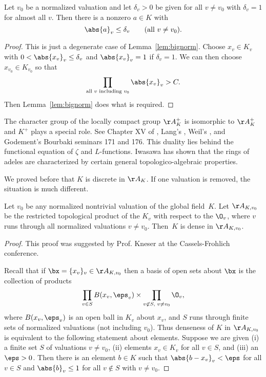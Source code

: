 \documentclass[11pt]{book}
\begin{document}
\begin{ch}
\begin{corollary}\label{cor:small_a}
Let $v_0$ be a normalized valuation and let $\delta_v>0$ be given
for all $v\neq v_0$ with $\delta_v = 1$ for almost all $v$.  Then
there is a nonzero $a\in K$ with
$$
  \abs{a}_v \leq \delta_v\qquad\text{(all $v\neq v_0$)}.
$$
\end{corollary}
\begin{proof}
This is just a degenerate case of Lemma~\ref{lem:bignorm}.
Choose $x_v\in K_v$ with $0< \abs{x_v}_v \leq \delta_v$
and $\abs{x_v}_v=1$ if $\delta_v=1$.  We can then choose
$x_{v_0}\in K_{v_0}$ so that
$$
\prod_{\text{all $v$ including $v_0$}} \abs{x_v}_v > C.
$$
Then Lemma~\ref{lem:bignorm} does what is required.
\end{proof}

\begin{remark}
  The character group of the locally compact group $\AA_K^+$ is
  isomorphic to $\AA_K^+$ and $K^+$ plays a special role.  See Chapter
  XV of \cite{cassels-frohlich}, Lang's \cite{lang:algebraic_numbers},
  Weil's \cite{weil:adeles}, and Godement's Bourbaki seminars 171 and
  176.  This duality lies behind the functional equation of $\zeta$
  and $L$-functions.  Iwasawa has shown \cite{iwasawa:adele} that the
  rings of adeles are characterized by certain general
  topologico-algebraic properties.
\end{remark}

We proved before that $K$ is discrete in $\AA_K$.  If one valuation is
removed, the situation is much different.
\begin{theorem}\label{thm:strong}
  Let $v_0$ be any normalized nontrivial valuation of the global field~$K$.
  Let $\AA_{K,v_0}$ be the restricted topological product of the
  $K_v$ with respect to the $\O_v$, where $v$ runs through all
  normalized valuations $v\neq v_0$.  Then~$K$ is dense in
  $\AA_{K,v_0}$.
\end{theorem}
\begin{proof}
This proof was suggested by Prof. Kneser at the Cassels-Frohlich
conference.

Recall that if $\bx =\{x_v\}_v\in \AA_{K,v_0}$ then a basis of open
sets about $\bx$ is the collection of products
$$\prod_{v\in S} B(x_v,\eps_v) \times \prod_{v\not\in S,\,\, v\neq v_0} \O_v,$$
where $B(x_v,\eps_v)$ is an open ball in $K_v$ about $x_v$, and
$S$ runs through finite sets of normalized valuations (not including
$v_0$).  Thus
denseness of $K$ in $\AA_{K,v_0}$ is equivalent to the following
statement about elements.  Suppose we are given (i) a finite set $S$
of valuations $v\neq v_0$, (ii) elements $x_v\in K_v$ for all $v\in
S$, and (iii) an $\eps>0$.  Then there is an element $b\in K$ such that
$\abs{b-x_v}_v<\eps$ for all $v\in S$ and $\abs{b}_v\leq 1$ for all
$v\not\in S$ with $v\neq v_0$.


\end{proof}
\end{ch}
\end{document}
